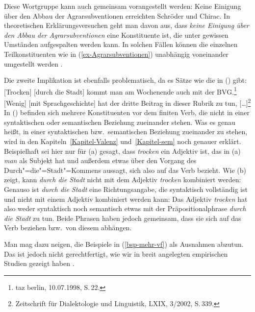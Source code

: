 Diese Wortgruppe kann auch gemeinsam vorangestellt werden:
\ea
Keine Einigung über den Abbau der Agrarsubventionen erreichten Schröder und Chirac.
\z
In theoretischen Erklärungsversuchen geht man davon aus, dass \emph{keine Einigung über den Abbau der Agrarsubventionen}
eine Konstituente ist, die unter gewissen Umständen aufgespalten werden kann. In solchen Fällen können die einzelnen
Teilkonstituenten wie in (\ref{ex-Agrarsubventionen}) unabhängig voneinander umgestellt werden \citep{deKuthy2002a}.



Die zweite Implikation ist ebenfalls problematisch, da es Sätze
wie die in () gibt:
\eal
\label{bsp-mehr-vf}
\ex\label{bsp-trocken-durch-die-stadt}
{}[Trocken] [durch die Stadt] kommt man am Wochenende auch mit der BVG.\footnote{
        taz berlin, 10.07.1998, S.\,22.
      }
\ex {}[Wenig] [mit Sprachgeschichte] hat der dritte Beitrag in dieser Rubrik zu tun, [\ldots]\footnote{
  Zeitschrift für Dialektologie und Linguistik, LXIX, 3/2002, S.\,339.
}
\zl
In () befinden sich mehrere Konstituenten vor dem finiten Verb, die nicht in einer syntaktischen
oder semantischen
Beziehung zueinander stehen. Was es genau heißt,
in einer syntaktischen bzw.\ semantischen Beziehung zueinander zu stehen, wird in den
Kapiteln~\ref{Kapitel-Valenz} und~\ref{Kapitel-sem} noch genauer erklärt. Beispielhaft sei hier nur
für (a) gesagt, dass \emph{trocken} ein Adjektiv ist, das in (a) \emph{man}
als Subjekt hat und außerdem etwas über den Vorgang des Durch"=die"=Stadt"=Kommens aussagt,
sich also auf das Verb bezieht. Wie (b) zeigt, kann \emph{durch die Stadt} nicht
mit dem Adjektiv \emph{trocken} kombiniert werden:
\eal
{}
\zl
Genauso ist \emph{durch die Stadt} eine Richtungsangabe, die syntaktisch vollständig ist
und nicht mit einem Adjektiv kombiniert werden kann:
\eal
{}
\zl
Das Adjektiv \emph{trocken} hat also weder syntaktisch noch semantisch etwas mit 
der Präpositionalphrase \emph{durch die Stadt} zu tun. Beide Phrasen haben jedoch gemeinsam,
dass sie sich auf das Verb beziehen bzw.\ von diesem abhängen.

Man mag dazu neigen, die Beispiele in (\ref{bsp-mehr-vf}) als Ausnahmen
abzutun. Das ist jedoch nicht gerechtfertigt, wie wir in breit angelegten empirischen
Studien gezeigt haben \parencites{Mueller2003b}[Abschnitt~3.1]{MuellerGS}{Bildhauer2011a}.

